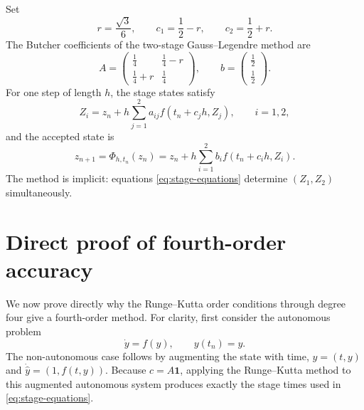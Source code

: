 \documentclass[11pt,a4paper]{article}
\newcommand{\Phih}{\Phi_{h,t_n}}
\begin{document}
Set
\[
 r=\frac{\sqrt{3}}{6},
 \qquad
 c_1=\frac12-r,
 \qquad
 c_2=\frac12+r.
\]
The Butcher coefficients of the two-stage Gauss--Legendre method are
\begin{equation}
 A=
 \begin{pmatrix}
  \frac14&\frac14-r\\[1mm]
  \frac14+r&\frac14
 \end{pmatrix},
 \qquad
 b=
 \begin{pmatrix}
  \frac12\\[1mm]
  \frac12
 \end{pmatrix}.
 \label{eq:tableau}
\end{equation}
For one step of length $h$, the stage states satisfy
\begin{equation}
 Z_i=z_n+h\sum_{j=1}^2a_{ij}f(t_n+c_jh,Z_j),
 \qquad i=1,2,
 \label{eq:stage-equations}
\end{equation}
and the accepted state is
\begin{equation}
 z_{n+1}=\Phih(z_n)
 =z_n+h\sum_{i=1}^2b_i f(t_n+c_ih,Z_i).
 \label{eq:step-map}
\end{equation}
The method is implicit: equations \eqref{eq:stage-equations} determine
$(Z_1,Z_2)$ simultaneously.

\clearpage

\section{Direct proof of fourth-order accuracy}

We now prove directly why the Runge--Kutta order conditions through degree four
give a fourth-order method.  For clarity, first consider the autonomous
problem
\begin{equation}
 \dot y=f(y),
 \qquad y(t_n)=y.
 \label{eq:autonomous-order-problem}
\end{equation}
The non-autonomous case follows by augmenting the state with time,
$\widehat y=(t,y)$ and $\dot{\widehat y}=(1,f(t,y))$.  Because
$c=A\mathbf{1}$, applying the Runge--Kutta method to this augmented autonomous
system produces exactly the stage times used in
\eqref{eq:stage-equations}.
\end{document}
